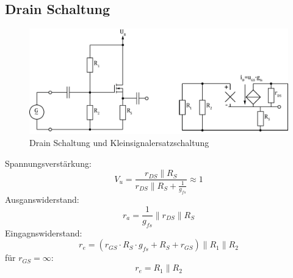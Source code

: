 



\subsection{Drain Schaltung}
\begin{figure}[h!]
	\centering
	\includegraphics[width = \linewidth]{fet_drain.pdf}
	\caption{Drain Schaltung und Kleinsignalersatzschaltung}
	\label{fet:drainschaltung}
\end{figure}
\noindent
Spannungsverstärkung:
\[
	V_u = \frac{r_{DS} \parallel R_S}{r_{DS} \parallel R_S + \frac{1}{g_{fs}}} \approx 1
\]
Ausganswiderstand:
\[
	r_a = \frac{1}{g_{fs}} \parallel r_{DS} \parallel R_S
\]
Eingagnswiderstand:
\[
	r_e = (r_{GS} \cdot R_S \cdot g_{fs} + R_S + r_{GS}) \parallel R_1 \parallel R_2
\]
für $r_{GS} = \infty$:
\[
	r_e = R_1 \parallel R_2
\]